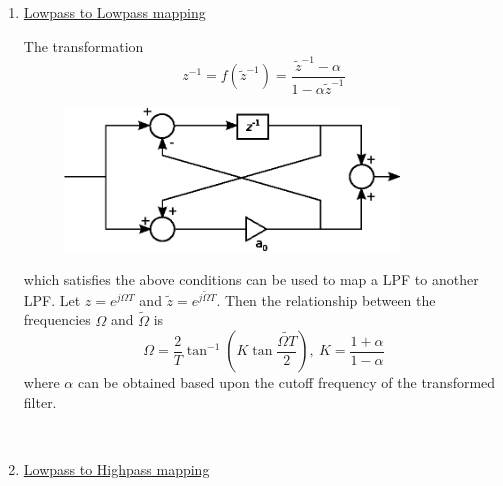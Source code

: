 \documentclass [12pt]{article}   %
\begin{document}
\begin{enumerate}
	\item \underline{Lowpass to Lowpass mapping} 
	
	The transformation
	\begin{equation}
		z^{-1} = f(\tilde{z}^{-1}) = \frac{\tilde{z}^{-1}-\alpha}{1-\alpha\tilde{z}^{-1}}
	\end{equation}
	\begin{figure}[H]
		\centering
		\includegraphics[width=3.5in]{transformation1.eps}
		\label{fig:transformation1}
	\end{figure}
	which satisfies the above conditions can be used to map a LPF to another LPF. Let $z=e^{j\Omega T}$ and $\tilde{z} = e^{j\tilde{\Omega}T}$. Then the relationship between the frequencies $\Omega$ and $\tilde{\Omega}$ is
	\begin{equation}
		\Omega = \frac{2}{T} \tan^{-1}(K \tan \frac{\tilde{\Omega T}}{2}),~K = \frac{1+\alpha}{1-\alpha}
	\end{equation}
	where $\alpha$ can be obtained based upon the cutoff frequency of the transformed filter.
	\bigskip
	\begin{figure}[H]
		\begin{center}
			\mbox{
				 \quad
			}
		\end{center}
	\end{figure}
	\newpage
	\item \underline{Lowpass to Highpass mapping}
	

\end{enumerate}
\end{document}
